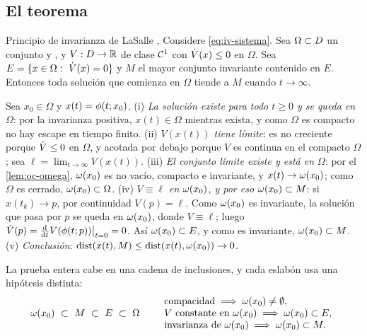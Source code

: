 \subsection{El teorema}

\begin{teorema}[label=thm:iv-lasalle]{Principio de invarianza de LaSalle \citep{LaS60}, \citep[Teo.~4.4]{Kha02}}
Considere \eqref{eq:iv-sistema}. Sea $\Omega\subset D$ un conjunto  y , y $V:D\to\mathbb{R}$ de clase $\mathcal{C}^{1}$ con $\dot V(x)\le0$ en $\Omega$. Sea $E=\{x\in\Omega:\ \dot V(x)=0\}$ y $M$ el mayor conjunto invariante contenido en $E$. Entonces toda solución que comienza en $\Omega$ tiende a $M$ cuando $t\to\infty$.
\end{teorema}

\begin{demostracion}
Sea $x_0\in\Omega$ y $x(t)=\phi(t;x_0)$. (i) \emph{La solución existe para todo $t\ge0$ y se queda en $\Omega$}: por la invarianza positiva, $x(t)\in\Omega$ mientras exista, y como $\Omega$ es compacto no hay escape en tiempo finito. (ii) \emph{$V(x(t))$ tiene límite}: es no creciente porque $\dot V\le0$ en $\Omega$, y acotada por debajo porque $V$ es continua en el compacto $\Omega$; sea $\ell=\lim_{t\to\infty}V(x(t))$. (iii) \emph{El conjunto límite existe y está en $\Omega$}: por el \cref{lem:oc-omega}, $\omega(x_0)$ es no vacío, compacto e invariante, y $x(t)\to\omega(x_0)$; como $\Omega$ es cerrado, $\omega(x_0)\subset\Omega$. (iv) \emph{$V\equiv\ell$ en $\omega(x_0)$, y por eso $\omega(x_0)\subset M$}: si $x(t_k)\to p$, por continuidad $V(p)=\ell$. Como $\omega(x_0)$ es invariante, la solución que pasa por $p$ se queda en $\omega(x_0)$, donde $V\equiv\ell$; luego $\dot V(p)=\frac{\mathrm{d}}{\mathrm{d} t}V(\phi(t;p))\big|_{t=0}=0$. Así $\omega(x_0)\subset E$, y como es invariante, $\omega(x_0)\subset M$. (v) \emph{Conclusión}: $\operatorname{dist}(x(t),M)\le\operatorname{dist}(x(t),\omega(x_0))\to0$.
\end{demostracion}

La prueba entera cabe en una cadena de inclusiones, y cada eslabón usa una hipótesis distinta:
\begin{equation}
  \omegalim{x_0}\ \subset\ M\ \subset\ E\ \subset\ \Omega
  \qquad\begin{array}{l}
  \text{compacidad}\implica\omegalim{x_0}\neq\emptyset,\\
  V\text{ constante en }\omegalim{x_0}\implica\omegalim{x_0}\subset E,\\
  \text{invarianza de }\omegalim{x_0}\implica\omegalim{x_0}\subset M .
  \end{array}
  \label{eq:iv-cadena}
\end{equation}

